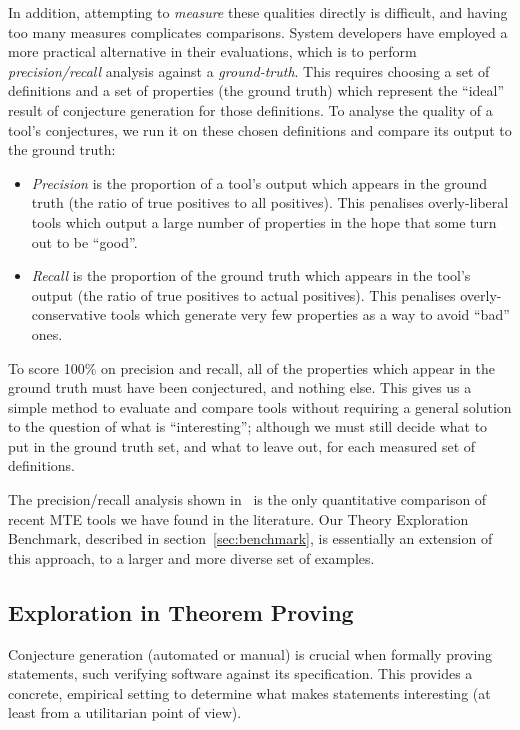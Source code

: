 In addition, attempting to \emph{measure} these qualities directly is difficult,
and having too many measures complicates comparisons. System developers have
employed a more practical alternative in their evaluations, which is to perform
\emph{precision/recall} analysis against a \emph{ground-truth}. This requires
choosing a set of definitions and a set of properties (the ground truth) which
represent the ``ideal'' result of conjecture generation for those definitions.
To analyse the quality of a tool's conjectures, we run it on these chosen
definitions and compare its output to the ground truth:

\begin{itemize}
\item \emph{Precision} is the proportion of a tool's output which appears in
  the ground truth (the ratio of true positives to all positives). This
  penalises overly-liberal tools which output a large number of properties in
  the hope that some turn out to be ``good''.
\item \emph{Recall} is the proportion of the ground truth which appears in the
  tool's output (the ratio of true positives to actual positives). This
  penalises overly-conservative tools which generate very few properties as a
  way to avoid ``bad'' ones.
\end{itemize}

To score 100\% on precision and recall, all of the properties which appear in
the ground truth must have been conjectured, and nothing else. This gives us a
simple method to evaluate and compare tools without requiring a general solution
to the question of what is ``interesting''; although we must still decide what
to put in the ground truth set, and what to leave out, for each measured set of
definitions.

The precision/recall analysis shown in~\cite{claessen2013automating} is the only
quantitative comparison of recent MTE tools we have found in the literature.
Our Theory Exploration Benchmark, described in section~\ref{sec:benchmark}, is
essentially an extension of this approach, to a larger and more diverse set of
examples.

\subsection{Exploration in Theorem Proving}
\label{sec:examples}

Conjecture generation (automated or manual) is crucial when formally proving
statements, such verifying software against its specification. This provides a
concrete, empirical setting to determine what makes statements interesting (at
least from a utilitarian point of view).

